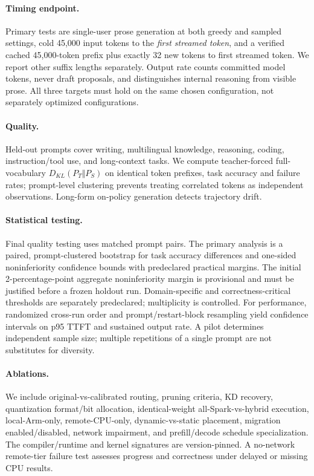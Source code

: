 \documentclass[10pt,twocolumn]{article}
\begin{document}
\paragraph{Timing endpoint.} Primary tests are single-user prose generation at both greedy and sampled settings, cold 45,000 input tokens to the \emph{first streamed token}, and a verified cached 45,000-token prefix plus exactly 32 new tokens to first streamed token. We report other suffix lengths separately. Output rate counts committed model tokens, never draft proposals, and distinguishes internal reasoning from visible prose. All three targets must hold on the same chosen configuration, not separately optimized configurations.

\paragraph{Quality.} Held-out prompts cover writing, multilingual knowledge, reasoning, coding, instruction/tool use, and long-context tasks. We compute teacher-forced full-vocabulary $D_{KL}(P_T\Vert P_S)$ on identical token prefixes, task accuracy and failure rates; prompt-level clustering prevents treating correlated tokens as independent observations. Long-form on-policy generation detects trajectory drift.

\paragraph{Statistical testing.} Final quality testing uses matched prompt pairs. The primary analysis is a paired, prompt-clustered bootstrap for task accuracy differences and one-sided noninferiority confidence bounds with predeclared practical margins. The initial 2-percentage-point aggregate noninferiority margin is provisional and must be justified before a frozen holdout run. Domain-specific and correctness-critical thresholds are separately predeclared; multiplicity is controlled. For performance, randomized cross-run order and prompt/restart-block resampling yield confidence intervals on p95 TTFT and sustained output rate. A pilot determines independent sample size; multiple repetitions of a single prompt are not substitutes for diversity.

\paragraph{Ablations.} We include original-vs-calibrated routing, pruning criteria, KD recovery, quantization format/bit allocation, identical-weight all-Spark-vs-hybrid execution, local-Arm-only, remote-CPU-only, dynamic-vs-static placement, migration enabled/disabled, network impairment, and prefill/decode schedule specialization. The compiler/runtime and kernel signatures are version-pinned. A no-network remote-tier failure test assesses progress and correctness under delayed or missing CPU results.
\end{document}
